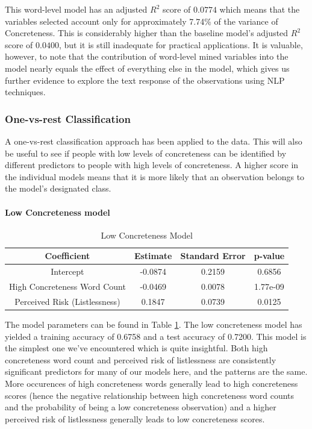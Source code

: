 \documentclass[12pt, a4paper]{article}
\begin{document}
This word-level model has an adjusted $R^2$ score of $0.0774$ which means that the variables selected account only for approximately 7.74\% of the variance of Concreteness. This is considerably higher than the baseline model's adjusted $R^2$ score of $0.0400$, but it is still inadequate for practical applications. It is valuable, however, to note that the contribution of word-level mined variables into the model nearly equals the effect of everything else in the model, which gives us further evidence to explore the text response of the observations using NLP techniques.
 
\subsubsection{One-vs-rest Classification}

A one-vs-rest classification approach has been applied to the data. This will also be useful to see if people with low levels of concreteness can be identified by different predictors to people with high levels of concreteness. A higher score in the individual models means that it is more likely that an observation belongs to the model's designated class.

\paragraph{Low Concreteness model}

\begin{table}[ht]
\centering
\begin{tabular}{||c c c c||} 
 \hline
 Coefficient & Estimate & Standard Error & p-value \\ [0.5ex] 
 \hline\hline
 Intercept & -0.0874 & 0.2159 & 0.6856 \\ 
 High Concreteness Word Count & -0.0469 & 0.0078 & 1.77e-09 \\
 Perceived Risk (Listlessness)  & 0.1847 & 0.0739 & 0.0125 \\ [1ex] 
 \hline
\end{tabular}
\caption{Low Concreteness Model}
\label{table:low}
\end{table}

The model parameters can be found in Table \ref{table:low}. The low concreteness model has yielded a training accuracy of 0.6758 and a test accuracy of 0.7200. This model is the simplest one we've encountered which is quite insightful. Both high concreteness word count and perceived risk of listlessness are consistently significant predictors for many of our models here, and the patterns are the same. More occurences of high concreteness words generally lead to high concreteness scores (hence the negative relationship between high concreteness word counts and the probability of being a low concreteness observation) and a higher perceived risk of listlessness generally leads to low concreteness scores.
\end{document}
